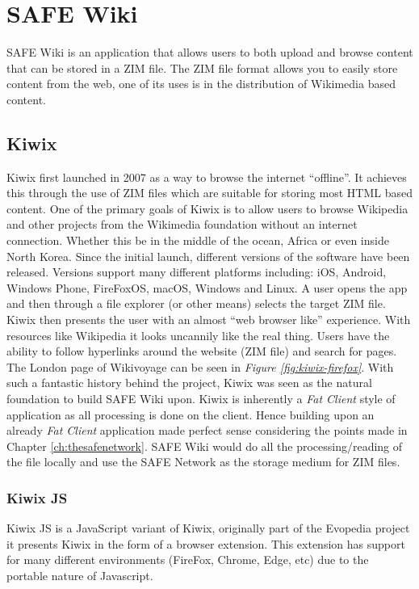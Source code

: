 \chapter{SAFE Wiki}

SAFE Wiki is an application that allows users to both upload and browse content that can be stored in a ZIM file. The ZIM file format allows you to easily store content from the web, one of its uses is in the distribution of Wikimedia based content.

\section{Kiwix}

Kiwix first launched in 2007 as a way to browse the internet ``offline''. It achieves this through the use of ZIM files which are suitable for storing most HTML based content. One of the primary goals of Kiwix is to allow users to browse Wikipedia and other projects from the Wikimedia foundation without an internet connection. Whether this be in the middle of the ocean, Africa or even inside North Korea. Since the initial launch, different versions of the software have been released. Versions support many different platforms including: iOS, Android, Windows Phone, FireFoxOS, macOS, Windows and Linux. A user opens the app and then through a file explorer (or other means) selects the target ZIM file. Kiwix then presents the user with an almost ``web browser like'' experience. With resources like Wikipedia it looks uncannily like the real thing. Users have the ability to follow hyperlinks around the website (ZIM file) and search for pages. The London page of Wikivoyage can be seen in \textit{Figure \ref{fig:kiwix-firefox}}. With such a fantastic history behind the project, Kiwix was seen as the natural foundation to build SAFE Wiki upon. Kiwix is inherently a \textit{Fat Client} style of application as all processing is done on the client. Hence building upon an already \textit{Fat Client} application made perfect sense considering the points made in Chapter \ref{ch:thesafenetwork}. SAFE Wiki would do all the processing/reading of the file locally and use the SAFE Network as the storage medium for ZIM files.

\subsection{Kiwix JS}

Kiwix JS is a JavaScript variant of Kiwix, originally part of the Evopedia project it presents Kiwix in the form of a browser extension. This extension has support for many different environments (FireFox, Chrome, Edge, etc) due to the portable nature of Javascript.

